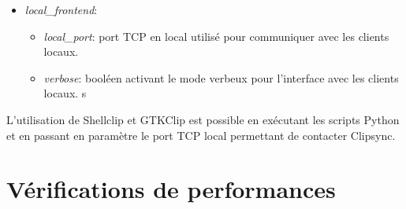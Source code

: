 \begin{itemize}
\begin{itemize}
    l'envoi de messages OK.
  \item \emph{verbose}, \emph{verbose\_bcast}, \emph{verbose\_peer}:
    booléens permettant d'activer ou de désactiver le mode verbeux
    \footnote{Le mode verbeux permet d'afficher sur la sortie standard
    des informations sur l'activité du logiciel.} de Clipsync.
  \end{itemize}
\item \emph{local\_frontend}:
  \begin{itemize}
  \item \emph{local\_port}: port TCP en local utilisé pour communiquer avec les
    clients locaux.
  \item \emph{verbose}: booléen activant le mode verbeux pour l'interface avec
    les clients locaux.
s  \end{itemize}
\end{itemize}

L'utilisation de Shellclip et GTKClip est possible en exécutant les scripts
Python et en passant en paramètre le port TCP local permettant de contacter
Clipsync.

\section{Vérifications de performances}
